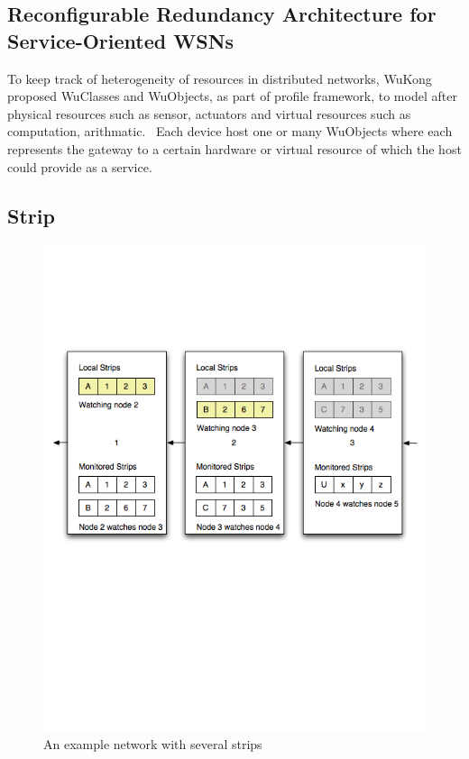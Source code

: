 \subsection{Reconfigurable Redundancy Architecture for Service-Oriented WSNs}

To keep track of heterogeneity of resources in distributed networks, WuKong
proposed WuClasses and WuObjects, as part of profile framework, to model after
physical resources such as sensor, actuators and virtual resources such as
computation, arithmatic.~\cite{Reijers} Each device host one or many WuObjects
where each represents the gateway to a certain hardware or virtual resource of
which the host could provide as a service.

\subsection{Strip}
\label{s:ss}

\begin{figure}[h!]
\caption{An example network with several strips}
\label{fig:strip1}
\centering
    \includegraphics[width=\linewidth]{figures/strip1}
\end{figure}


